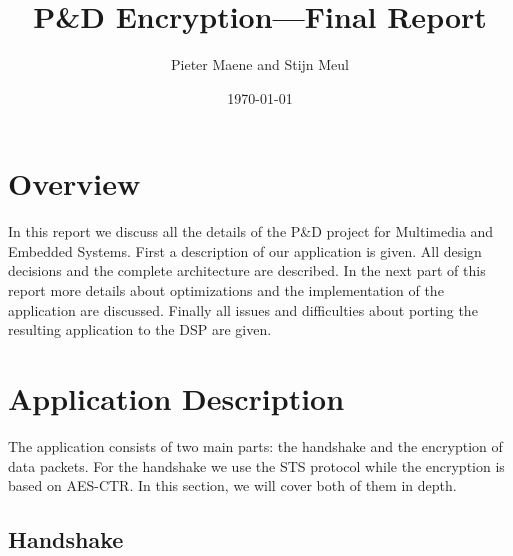 \documentclass[a4paper]{article}
\title{P\&D Encryption---Final Report}
\author{Pieter Maene and Stijn Meul}
\date{\today}
\begin{document}
\maketitle

\section{Overview}
In this report we discuss all the details of the P\&D project for Multimedia and Embedded Systems. First a description of our application is given. All design decisions and the complete architecture are described. In the next part of this report more details about optimizations and the implementation of the application are discussed. Finally all issues and difficulties about porting the resulting application to the DSP are given.

\section{Application Description}

The application consists of two main parts: the handshake and the encryption of data packets. For the handshake we use the STS protocol while the encryption is based on AES-CTR. In this section, we will cover both of them in depth.

\subsection{Handshake}
\end{document}
